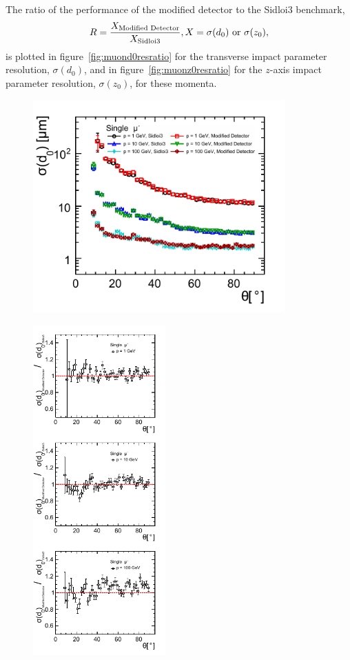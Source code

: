The ratio of the performance of the modified detector to
the Sidloi3 benchmark,
\begin{equation}
R=\frac{X_{\mbox{\scriptsize{Modified Detector}}}}{X_{\mbox{\scriptsize{Sidloi3}}}}, X = \sigma(d_{0})\mbox{ or } \sigma(z_{0}),
\label{eq:impactparameter}
\end{equation}
is plotted in figure~\ref{fig:muond0resratio} for 
the transverse impact parameter resolution, $\sigma(d_{0})$,
and in figure~\ref{fig:muonz0resratio} for 
the $z$-axis impact parameter resolution, $\sigma(z_{0})$, for these momenta.
\begin{figure}[h!]
\begin{minipage}{3.8in}
\centering
\includegraphics[width=3.8in]{muonD0ResolutionThetaTwoDetectors2.pdf}
\label{fig:muond0restwodetectors}
\end{minipage}
\begin{minipage}{2.0in}
\centering
\includegraphics[width=2.0in]{muonD0ResRatio2.pdf}

\end{minipage}
\end{figure}
